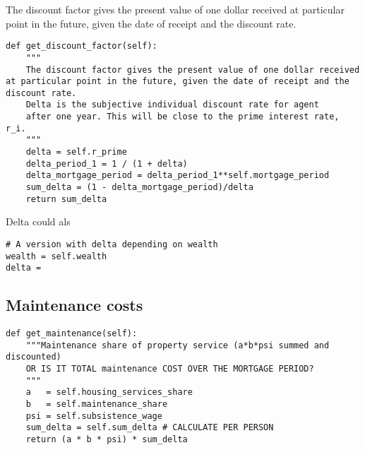 {The discount factor gives the present value of one dollar received at particular point in the future, given the date of receipt and the discount rate.

    
\begin{lstlisting}
def get_discount_factor(self):
    """
    The discount factor gives the present value of one dollar received at particular point in the future, given the date of receipt and the discount rate.
    Delta is the subjective individual discount rate for agent
    after one year. This will be close to the prime interest rate, r_i.
    """    
    delta = self.r_prime
    delta_period_1 = 1 / (1 + delta) 
    delta_mortgage_period = delta_period_1**self.mortgage_period
    sum_delta = (1 - delta_mortgage_period)/delta
    return sum_delta
\end{lstlisting}
Delta could als%


\begin{lstlisting}
# A version with delta depending on wealth
wealth = self.wealth
delta =
\end{lstlisting}

\subsection{Maintenance costs}
\begin{lstlisting}
def get_maintenance(self):
    """Maintenance share of property service (a*b*psi summed and discounted)
    OR IS IT TOTAL maintenance COST OVER THE MORTGAGE PERIOD?
    """
    a   = self.housing_services_share
    b   = self.maintenance_share
    psi = self.subsistence_wage
    sum_delta = self.sum_delta # CALCULATE PER PERSON
    return (a * b * psi) * sum_delta
\end{lstlisting}

}
